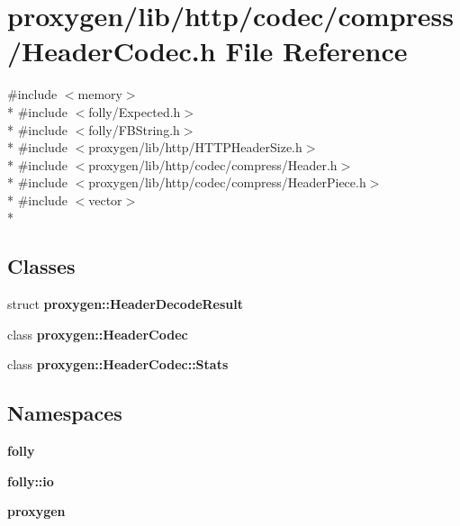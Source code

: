 \section{proxygen/lib/http/codec/compress/\+Header\+Codec.h File Reference}
\label{HeaderCodec_8h}
{\ttfamily \#include $<$memory$>$}\\*
{\ttfamily \#include $<$folly/\+Expected.\+h$>$}\\*
{\ttfamily \#include $<$folly/\+F\+B\+String.\+h$>$}\\*
{\ttfamily \#include $<$proxygen/lib/http/\+H\+T\+T\+P\+Header\+Size.\+h$>$}\\*
{\ttfamily \#include $<$proxygen/lib/http/codec/compress/\+Header.\+h$>$}\\*
{\ttfamily \#include $<$proxygen/lib/http/codec/compress/\+Header\+Piece.\+h$>$}\\*
{\ttfamily \#include $<$vector$>$}\\*
\subsection*{Classes}
\begin{DoxyCompactItemize}
\item 
struct {\bf proxygen\+::\+Header\+Decode\+Result}
\item 
class {\bf proxygen\+::\+Header\+Codec}
\item 
class {\bf proxygen\+::\+Header\+Codec\+::\+Stats}
\end{DoxyCompactItemize}
\subsection*{Namespaces}
\begin{DoxyCompactItemize}
\item 
 {\bf folly}
\item 
 {\bf folly\+::io}
\item 
 {\bf proxygen}
\end{DoxyCompactItemize}
